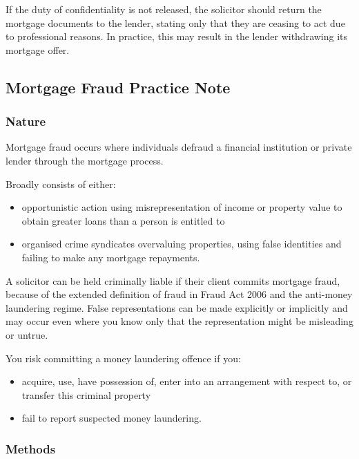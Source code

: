 \documentclass[
]{article}
\providecommand{\tightlist}{%
  \setlength{\itemsep}{0pt}\setlength{\parskip}{0pt}}
\begin{document}
If the duty of confidentiality is not released, the solicitor should
return the mortgage documents to the lender, stating only that they are
ceasing to act due to professional reasons. In practice, this may result
in the lender withdrawing its mortgage offer.

\hypertarget{mortgage-fraud-practice-note}{%
\subsection{Mortgage Fraud Practice
Note}\label{mortgage-fraud-practice-note}}

\hypertarget{nature}{%
\subsubsection{Nature}\label{nature}}

Mortgage fraud occurs where individuals defraud a financial institution
or private lender through the mortgage process.

Broadly consists of either:

\begin{itemize}
\tightlist
\item
  opportunistic action using misrepresentation of income or property
  value to obtain greater loans than a person is entitled to
\item
  organised crime syndicates overvaluing properties, using false
  identities and failing to make any mortgage repayments.
\end{itemize}

A solicitor can be held criminally liable if their client commits
mortgage fraud, because of the extended definition of fraud in Fraud Act
2006 and the anti-money laundering regime. False representations can be
made explicitly or implicitly and may occur even where you know only
that the representation might be misleading or untrue.

You risk committing a money laundering offence if you:

\begin{itemize}
\tightlist
\item
  acquire, use, have possession of, enter into an arrangement with
  respect to, or transfer this criminal property
\item
  fail to report suspected money laundering.
\end{itemize}

\hypertarget{methods}{%
\subsubsection{Methods}\label{methods}}
\end{document}
